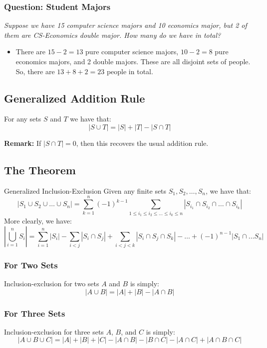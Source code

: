 \documentclass[letterpaper]{article}
\begin{document}
\subsubsection{Question: Student Majors}
\emph{Suppose we have 15 computer science majors and 10 economics major, but 2 of them are CS-Economics double major. How many do we have in total?}
\begin{itemize}
    \item There are $15 - 2 = 13$ pure computer science majors, $10 - 2 = 8$ pure economics majors, and 2 double majors. These are all disjoint sets of people. So, there are $13 + 8 + 2 = 23$ people in total. 
\end{itemize}

\subsection{Generalized Addition Rule}
\begin{theorem}{}{}
    For any sets $S$ and $T$ we have that:
    \[|S \cup T| = |S| + |T| - |S \cap T|\]
\end{theorem}
\textbf{Remark:} If $|S \cap T| = 0$, then this recovers the usual addition rule. 

\subsection{The Theorem}
\begin{theorem}{Generalized Inclusion-Exclusion}{}
    Given any finite sets $S_1, S_2, \dots, S_n$, we have that:
    \[|S_1 \cup S_2 \cup \dots \cup S_n| = \sum_{k = 1}^n (-1)^{k - 1} \sum_{1 \leq i_1 \leq i_2 \leq \dots \leq i_k \leq n} |S_{i_{1}} \cap S_{i_{2}} \cap \dots \cap S_{i_{k}}|\]
    More clearly, we have:
    \[\left| \bigcup_{i = 1}^n S_i \right| = \sum_{i = 1}^n |S_i| - \sum_{i < j} |S_i \cap S_j| + \sum_{i < j < k} |S_i \cap S_j \cap S_k| - \dots + (-1)^{n - 1} |S_1 \cap \dots S_n|\]
\end{theorem}

\subsubsection{For Two Sets}
Inclusion-exclusion for two sets $A$ and $B$ is simply:
\[|A \cup B| = |A| + |B| - |A \cap B|\]

\subsubsection{For Three Sets}
Inclusion-exclusion for three sets $A$, $B$, and $C$ is simply:
\[|A \cup B \cup C| = |A| + |B| + |C| - |A \cap B| - |B \cap C| - |A \cap C| + |A \cap B \cap C|\]
\end{document}
